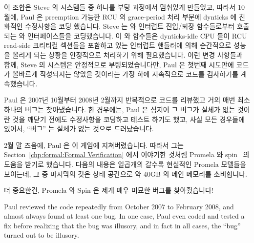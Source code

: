 이 조합은 Steve 의 시스템들 중 하나를 부팅 과정에서 멈춰있게 만들었고, 따라서
10월에, Paul 은 preemption 가능한 RCU 의 grace-period 처리 부분에 dynticks 에
친화적인 수정사항을 코딩 했습니다.
Steve 는  와  인터럽트 진입/퇴장 함수들로부터
호출되는  와  인터페이스들을
코딩했습니다.
이  와  함수들은 dynticks-idle CPU 들이
RCU read-side 크리티컬 섹션들을 포함하고 있는 인터럽트 핸들러에 의해 순간적으로
성능을 올리게 되는 상황을 안정적으로 처리하기 위해 필요했습니다.
이런 변경 사항들과 함께, Steve 의 시스템은 안정적으로 부팅되었습니다만, Paul 은
첫번째 시도만에 코드가 올바르게 작성되지는 않았을 것이라는 가정 하에 지속적으로
코드를 검사하기를 계속했습니다.
\iffalse

This combination caused one of Steve's systems to hang on boot, so in
October, Paul coded up a dynticks-friendly modification to preemptible RCU's
grace-period processing.
Steve coded up \co{rcu_irq_enter()} and \co{rcu_irq_exit()}
interfaces called from the
\co{irq_enter()} and \co{irq_exit()} interrupt
entry/exit functions.
These \co{rcu_irq_enter()} and \co{rcu_irq_exit()}
functions are needed to allow RCU to reliably handle situations where
a dynticks-idle CPUs is momentarily powered up for an interrupt
handler containing RCU read-side critical sections.
With these changes in place, Steve's system booted reliably,
but Paul continued inspecting the code periodically on the assumption
that we could not possibly have gotten the code right on the first try.
\fi

Paul 은 2007년 10월부터 2008년 2월까지 반복적으로 코드를 리뷰했고 거의 매번
최소 하나의 버그는 찾아냈습니다.
한 경우에는, Paul 은 심지어 그 버그가 실체가 없는 것이란 것을 깨닫기 전에도
수정사항을 코딩하고 테스트 하기도 했고, 사실 모든 경우들에 있어서, ``버그'' 는
실체가 없는 것으로 드러났습니다.

2월 말 즈음에, Paul 은 이 게임에 지쳐버렸습니다.
따라서 그는
Section~\ref{chp:formal:Formal Verification} 에서 이야기한 것처럼
Promela 와 spin~\cite{Holzmann03a} 의 도움을 받기로 했습니다.
다음의 내용은 일곱개의 갈수록 현실적인 Promela 모델들을 보이는데, 그 중
마지막의 것은 상태 공간으로 약 40GB 의 메인 메모리를 소비합니다.

더 중요한건, Promela 와 Spin 은 제게 매우 미묘한 버그를 찾아줬습니다!
\iffalse

Paul reviewed the code repeatedly from October 2007 to February 2008,
and almost always found at least one bug.
In one case, Paul even coded and tested a fix before realizing that the
bug was illusory, and in fact in all cases, the ``bug'' turned out to be
illusory.

